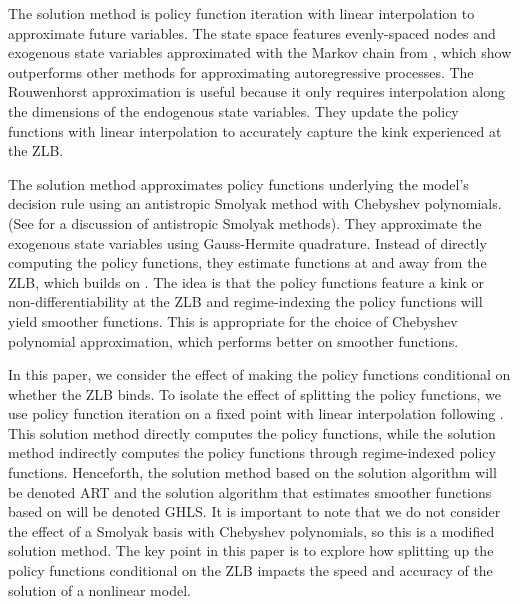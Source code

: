 \documentclass[12pt, final]{article}
\begin{document}
The \hyperlink{Atkinson}{\color{black}{Atkinson et al.\ (2019)}} solution method is policy function iteration with linear interpolation to approximate future variables.  The state space features evenly-spaced nodes and exogenous state variables  approximated with the Markov chain from \hyperlink{Rouwenhorst}{\color{black}{Rouwenhorst (1995)}}, which \hyperlink{Kopecky}{\color{black}{Kopecky and Suen (2010)}} show outperforms other methods for approximating autoregressive processes. The Rouwenhorst approximation is useful because it only requires interpolation along the dimensions of the endogenous state variables. They update the policy functions with linear interpolation to accurately capture the kink experienced at the ZLB.

The \hyperlink{Gust}{\color{black}{Gust et al.\ (2017)}} solution method approximates policy functions underlying the model's decision rule using an antistropic Smolyak method with Chebyshev polynomials. (See \hyperlink{Judd2}{\color{black}{Judd et al.\, 2014}} for a discussion of antistropic Smolyak methods). They approximate the exogenous state variables using Gauss-Hermite quadrature. Instead of directly computing the policy functions, they estimate functions at and away from the ZLB, which builds on \hyperlink{Christiano}{\color{black}{Christiano and Fisher (2000)}}. The idea is that the policy functions feature a kink or non-differentiability at the ZLB and regime-indexing the policy functions will yield smoother functions. This is appropriate for the choice of Chebyshev polynomial approximation, which performs better on smoother functions. 

In this paper, we consider the effect of making the policy functions conditional on whether the ZLB binds. To isolate the effect of splitting the policy functions, we use policy function iteration on a fixed point with linear interpolation following \hyperlink{Atkinson}{\color{black}{Atkinson et al.\ (2019)}}. This solution method directly computes the policy functions, while the \hyperlink{Gust}{\color{black}{Gust et al.\ (2017)}} solution method indirectly computes the policy functions through regime-indexed policy functions. Henceforth, the solution method based on the \hyperlink{Atkinson}{\color{black}{Atkinson et al.\ (2019)}} solution algorithm will be denoted ART and the solution algorithm that estimates smoother functions based on \hyperlink{Gust}{\color{black}{Gust et al.\ (2017)}} will be denoted GHLS. It is important to note that we do not consider the effect of a Smolyak basis with Chebyshev polynomials, so this is a modified \hyperlink{Gust}{\color{black}{Gust et al.\ (2017)}} solution method. The key point in this paper is to explore how splitting up the policy functions conditional on the ZLB impacts the speed and accuracy of the solution of a nonlinear model. 
\end{document}
